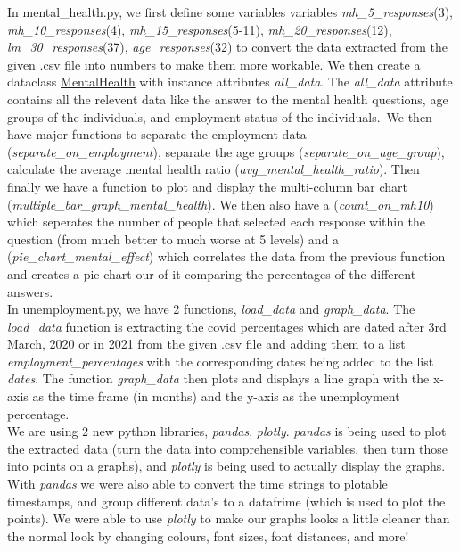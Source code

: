 \documentclass[fontsize=11pt]{article}
\begin{document}
    In mental\_health.py, we first define some variables variables \emph{mh\_5\_responses}(3), \emph{mh\_10\_responses}(4), \emph{mh\_15\_responses}(5-11), \emph{mh\_20\_responses}(12), \emph{lm\_30\_responses}(37), \emph{age\_responses}(32) to convert the data extracted from the given .csv file into numbers to make them more workable. We then create a dataclass \underline{MentalHealth} with instance attributes \emph{all\_data}. The \emph{all\_data} attribute contains all the relevent data like the answer to the mental health questions, age groups of the individuals, and employment status of the individuals.\
    We then have major functions to separate the employment data (\emph{separate\_on\_employment}), separate the age groups (\emph{separate\_on\_age\_group}), calculate the average mental health ratio (\emph{avg\_mental\_health\_ratio}). Then finally we have a function to plot and display the multi-column bar chart (\emph{multiple\_bar\_graph\_mental\_health}). We then also have a (\emph{count\_on\_mh10}) which seperates the number of people that selected each response within the question (from much better to much worse at 5 levels) and a (\emph{pie\_chart\_mental\_effect}) which correlates the data from the previous function and creates a pie chart our of it comparing the percentages of the different answers.
    \\

    In unemployment.py, we have 2 functions, \emph{load\_data} and \emph{graph\_data}. The \emph{load\_data} function is extracting the covid percentages which are dated after 3rd March, 2020 or in 2021 from the given .csv file and adding them to a list \emph{employment\_percentages} with the corresponding dates being added to the list \emph{dates}. The function \emph{graph\_data} then plots and displays a line graph with the x-axis as the time frame (in months) and the y-axis as the unemployment percentage.
    \\

    We are using 2 new python libraries, \emph{pandas}, \emph{plotly}. \emph{pandas} is being used to plot the extracted data (turn the data into comprehensible variables, then turn those into points on a graphs), and \emph{plotly} is being used to actually display the graphs. With \emph{pandas} we were also able to convert the time strings to plotable timestamps, and group different data's to a datafrime (which is used to plot the points). We were able to use \emph{plotly} to make our graphs looks a little cleaner than the normal look by changing colours, font sizes, font distances, and more!
\end{document}
